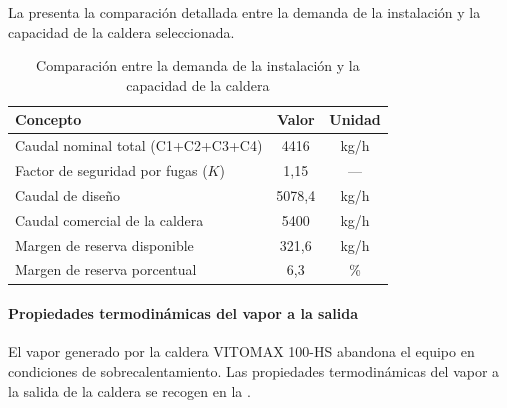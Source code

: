 \documentclass[12pt]{article}
\begin{document}
La  presenta la comparación detallada entre la demanda de la instalación y la capacidad de la caldera seleccionada.

\begin{table}[H]
	\centering
	\caption{Comparación entre la demanda de la instalación y la capacidad de la caldera}
	\label{tab:comparacion-demanda-caldera}
	\begin{tabular}{lcc}
		\toprule
		\textbf{Concepto}                   & \textbf{Valor} & \textbf{Unidad} \\
		\midrule
		Caudal nominal total (C1+C2+C3+C4)  & 4416           & kg/h            \\
		Factor de seguridad por fugas ($K$) & 1,15           & ---             \\
		Caudal de diseño                    & 5078,4         & kg/h            \\
		Caudal comercial de la caldera      & 5400           & kg/h            \\
		Margen de reserva disponible        & 321,6          & kg/h            \\
		Margen de reserva porcentual        & 6,3            & \%              \\
		\bottomrule
	\end{tabular}
\end{table}

\paragraph{Propiedades termodinámicas del vapor a la salida}

El vapor generado por la caldera VITOMAX 100-HS abandona el equipo en condiciones de sobrecalentamiento. Las propiedades termodinámicas del vapor a la salida de la caldera se recogen en la .
\end{document}
